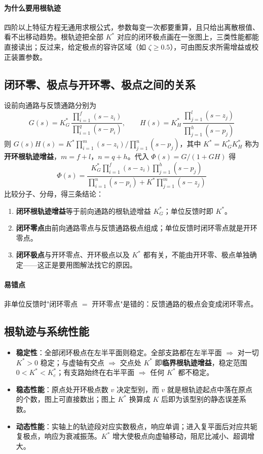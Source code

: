 \paragraph{为什么要用根轨迹}
四阶以上特征方程无通用求根公式，参数每变一次都要重算，且只给出离散根值、看不出移动趋势。根轨迹把全部 $K^*$ 对应的闭环极点画在一张图上，三类性能都能直接读出；反过来，给定极点的容许区域（如 $\zeta\ge0.5$），可由图反求所需增益或校正装置参数。

\subsection{闭环零、极点与开环零、极点之间的关系}
设前向通路与反馈通路分别为
\[
G(s)=K_G^*\,\frac{\prod_{i=1}^{f}(s-z_i)}{\prod_{i=1}^{q}(s-p_i)},
\qquad
H(s)=K_H^*\,\frac{\prod_{j=1}^{l}(s-z_j)}{\prod_{j=1}^{h}(s-p_j)}
\]
则 $G(s)H(s)=K^*\prod_{i=1}^{m}(s-z_i)\big/\prod_{j=1}^{n}(s-p_j)$，其中 $K^*=K_G^*K_H^*$ 称为\textbf{开环根轨迹增益}，$m=f+l$，$n=q+h$。代入 $\Phi(s)=G/(1+GH)$ 得
\[
\Phi(s)=
\frac{K_G^*\displaystyle\prod_{i=1}^{f}(s-z_i)\prod_{j=1}^{h}(s-p_j)}
{\displaystyle\prod_{i=1}^{n}(s-p_i)+K^*\prod_{j=1}^{m}(s-z_j)}
\]
比较分子、分母，得三条结论：
\begin{enumerate}
    \item \textbf{闭环根轨迹增益}等于前向通路的根轨迹增益 $K_G^*$；单位反馈时即 $K^*$。
    \item \textbf{闭环零点}由前向通路零点与反馈通路极点组成；单位反馈时闭环零点就是开环零点。
    \item \textbf{闭环极点}与开环零点、开环极点以及 $K^*$ 都有关，不能由开环零、极点单独确定——这正是要用图解法找它的原因。
\end{enumerate}

\paragraph{易错点}非单位反馈时"闭环零点 $=$ 开环零点"是错的：反馈通路的极点会变成闭环零点。

\subsection{根轨迹与系统性能}
\begin{itemize}
    \item \textbf{稳定性}：全部闭环极点在左半平面则稳定。全部支路都在左半平面 $\Rightarrow$ 对一切 $K^*>0$ 稳定；与虚轴有交点 $\Rightarrow$ 交点处 $K^*$ 即\textbf{临界根轨迹增益}，稳定范围 $0<K^*<K^*_c$；有支路始终在右半平面 $\Rightarrow$ 任何 $K^*$ 都不稳定。
    \item \textbf{稳态性能}：原点处开环极点数 $v$ 决定型别，而 $v$ 就是根轨迹起点中落在原点的个数，图上可直接数出；图上 $K^*$ 换算成 $K$ 后即为该型别的静态误差系数。
    \item \textbf{动态性能}：实轴上的轨迹段对应实数极点，响应单调；进入复平面后对应共轭复极点，响应为衰减振荡。$K^*$ 增大使极点向虚轴移动，阻尼比减小、超调增大。
\end{itemize}


